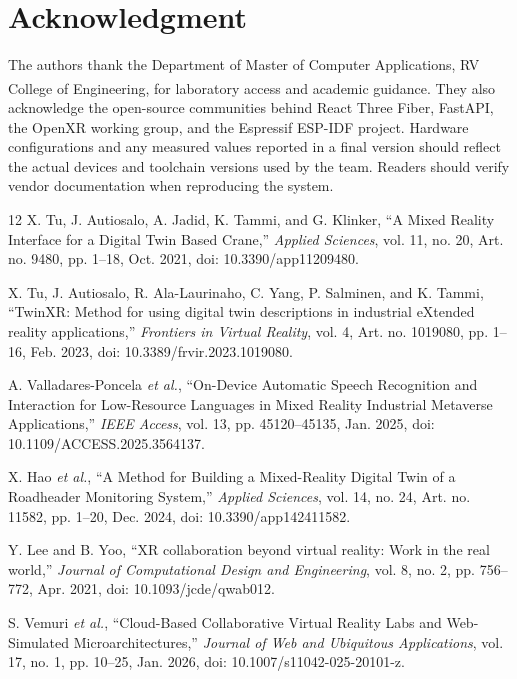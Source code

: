 \documentclass[conference]{IEEEtran}
\begin{document}
\section*{Acknowledgment}
The authors thank the Department of Master of Computer Applications, RV College of Engineering\textsuperscript{\textregistered}, for laboratory access and academic guidance. They also acknowledge the open-source communities behind React Three Fiber, FastAPI, the OpenXR working group, and the Espressif ESP-IDF project. Hardware configurations and any measured values reported in a final version should reflect the actual devices and toolchain versions used by the team. Readers should verify vendor documentation when reproducing the system.

\balance
\begin{thebibliography}{12}
X. Tu, J. Autiosalo, A. Jadid, K. Tammi, and G. Klinker, ``A Mixed Reality Interface for a Digital Twin Based Crane,'' \emph{Applied Sciences}, vol. 11, no. 20, Art. no. 9480, pp. 1--18, Oct. 2021, doi: 10.3390/app11209480.

X. Tu, J. Autiosalo, R. Ala-Laurinaho, C. Yang, P. Salminen, and K. Tammi, ``TwinXR: Method for using digital twin descriptions in industrial eXtended reality applications,'' \emph{Frontiers in Virtual Reality}, vol. 4, Art. no. 1019080, pp. 1--16, Feb. 2023, doi: 10.3389/frvir.2023.1019080.

A. Valladares-Poncela \emph{et al.}, ``On-Device Automatic Speech Recognition and Interaction for Low-Resource Languages in Mixed Reality Industrial Metaverse Applications,'' \emph{IEEE Access}, vol. 13, pp. 45120--45135, Jan. 2025, doi: 10.1109/ACCESS.2025.3564137.

X. Hao \emph{et al.}, ``A Method for Building a Mixed-Reality Digital Twin of a Roadheader Monitoring System,'' \emph{Applied Sciences}, vol. 14, no. 24, Art. no. 11582, pp. 1--20, Dec. 2024, doi: 10.3390/app142411582.

Y. Lee and B. Yoo, ``XR collaboration beyond virtual reality: Work in the real world,'' \emph{Journal of Computational Design and Engineering}, vol. 8, no. 2, pp. 756--772, Apr. 2021, doi: 10.1093/jcde/qwab012.

S. Vemuri \emph{et al.}, ``Cloud-Based Collaborative Virtual Reality Labs and Web-Simulated Microarchitectures,'' \emph{Journal of Web and Ubiquitous Applications}, vol. 17, no. 1, pp. 10--25, Jan. 2026, doi: 10.1007/s11042-025-20101-z.


\end{thebibliography}
\end{document}
